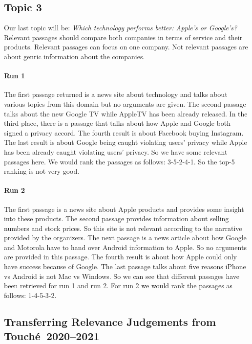 \subsection{Topic 3}

Our last topic will be:
\textit{Which technology performs better: Apple's or Google's?}
Relevant passages should compare both companies in terms of service and their products.
Relevant passages can focus on one company.
Not relevant passages are about genric information about the companies.

\paragraph{Run 1}

The first passage returned is a news site about technology and talks about various topics from this domain but no arguments are given.
The second passage talks about the new Google TV while AppleTV has been already released.
In the third place, there is a passage that talks about how Apple and Google both signed a privacy accord.
The fourth result is about Facebook buying Instagram.
The last result is about Google being caught violating users' privacy while Apple has been already caught violating users' privacy.
So we have some relevant passages here.
We would rank the passages as follows: 3-5-2-4-1.
So the top-5 ranking is not very good. 

\paragraph{Run 2}

The first passage is a news site about Apple products and provides some insight into these products.
The second passage provides information about selling numbers and stock prices.
So this site is not relevant according to the narrative provided by the organizers.
The next passage is a news article about how Google and Motorola have to hand over Android information to Apple.
So no arguments are provided in this passage.
The fourth result is about how Apple could only have success because of Google.
The last passage talks about five reasons iPhone vs Android is not Mac vs Windows.
So we can see that different passages have been retrieved for run 1 and run 2.
For run 2 we would rank the passages as follows: 1-4-5-3-2.


\subsection{Transferring Relevance Judgements from Touché~2020--2021}
\label{transfer-relevance-judgements}